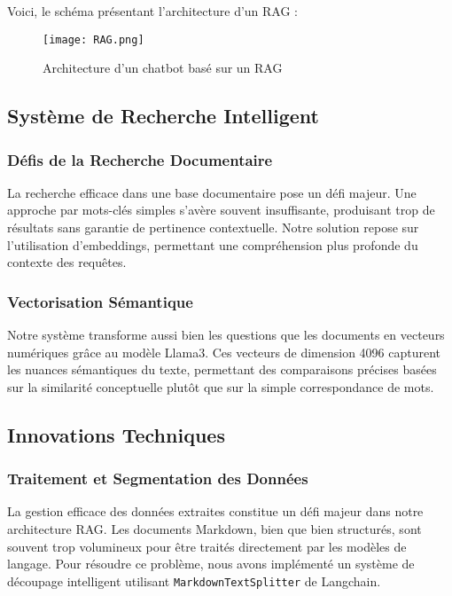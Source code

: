 \documentclass{article}
\begin{document}
Voici, le schéma présentant l'architecture d'un RAG : 

\begin{figure}[ht]
    \centering
    \texttt{[image: RAG.png]}
    \caption{Architecture d’un chatbot basé sur un RAG}
\end{figure}


\subsection{Système de Recherche Intelligent}

\subsubsection{Défis de la Recherche Documentaire}
La recherche efficace dans une base documentaire pose un défi majeur. Une approche par mots-clés simples s'avère souvent insuffisante, produisant trop de résultats sans garantie de pertinence contextuelle. Notre solution repose sur l'utilisation d'embeddings, permettant une compréhension plus profonde du contexte des requêtes.

\subsubsection{Vectorisation Sémantique}
Notre système transforme aussi bien les questions que les documents en vecteurs numériques grâce au modèle Llama3. Ces vecteurs de dimension 4096 capturent les nuances sémantiques du texte, permettant des comparaisons précises basées sur la similarité conceptuelle plutôt que sur la simple correspondance de mots.

\subsection{Innovations Techniques}

\subsubsection{Traitement et Segmentation des Données}
La gestion efficace des données extraites constitue un défi majeur dans notre architecture RAG. Les documents Markdown, bien que bien structurés, sont souvent trop volumineux pour être traités directement par les modèles de langage. Pour résoudre ce problème, nous avons implémenté un système de découpage intelligent utilisant \texttt{MarkdownTextSplitter} de Langchain. 
\end{document}
